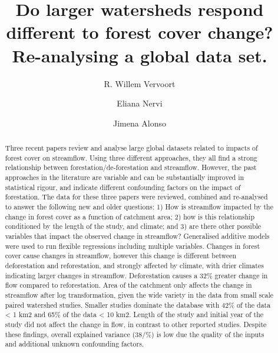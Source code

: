 \documentclass[]{elsarticle} %
\begin{document}
\begin{frontmatter}

  \title{Do larger watersheds respond different to forest cover change? Re-analysing a global data set.}
    \author[DARE, The University of Sydney]{R. Willem Vervoort}
    \author[INIA]{Eliana Nervi}
    \author[IMFIA]{Jimena Alonso}
      \address[DARE]{ARC Training Centre Data Analytics for Resources and the Environment}
    \address[The University of Sydney]{School of Life and Environmental Sciences, The University of Sydney, Sydney, NSW 2006, Australia}
    \address[INIA]{Project Manager, FPTA 357, Instituto Nacional de Investigación Agropecuaria, INIA-Uruguay, Ruta 48 km 10, Rincon del Colorado, 90100 Canelones, Uruguay}
    \address[IMFIA]{Institute of Fluid Mechanics and Environmental Engineering, School of Engineering, Universidad de la República, 11200 Montevideo, Uruguay}
  
  \begin{abstract}
  Three recent papers review and analyse large global datasets related to impacts of forest cover on streamflow. Using three different approaches, they all find a strong relationship between forestation/de-forestation and streamflow. However, the past approaches in the literature are variable and can be substantially improved in statistical rigour, and indicate different confounding factors on the impact of forestation. The data for these three papers were reviewed, combined and re-analysed to answer the following new and older questions: 1) How is streamflow impacted by the change in forest cover as a function of catchment area; 2) how is this relationship conditioned by the length of the study, and climate; and 3) are there other possible variables that impact the observed change in streamflow? Generalised additive models were used to run flexible regressions including multiple variables.
  Changes in forest cover cause changes in streamflow, however this change is different between deforestation and reforestation, and strongly affected by climate, with drier climates indicating larger changes in streamflow. Deforestation causes a 32\% greater change in flow compared to reforestation. Area of the catchment only affects the change in streamflow after log transformation, given the wide variety in the data from small scale paired watershed studies. Smaller studies dominate the database with 42\% of the data \textless{} 1 km2 and 65\% of the data \textless{} 10 km2. Length of the study and initial year of the study did not affect the change in flow, in contrast to other reported studies. Despite these findings, overall explained variance (38/\%) is low due the quality of the inputs and additional unknown confounding factors.
  \end{abstract}
  
 \end{frontmatter}
\end{document}

